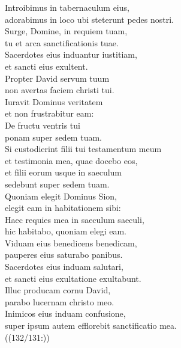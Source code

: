 \documentclass{ees}
\begin{document}
{\begin{multicols}{2}
    Introibimus in tabernaculum eius,\\
    adorabimus in loco ubi steterunt pedes nostri.\\
    Surge, Domine, in requiem tuam,\\
    tu et arca sanctificationis tuae.\\
    Sacerdotes eius induantur iustitiam,\\
    et sancti eius exultent.\\
    Propter David servum tuum\\
    non avertas faciem christi tui.\\
    Iuravit Dominus veritatem\\
    et non frustrabitur eam:\\
    De fructu ventris tui\\
    ponam super sedem tuam.\\
    Si custodierint filii tui testamentum meum\\
    et testimonia mea, quae docebo eos,\\
    et filii eorum usque in saeculum\\
    sedebunt super sedem tuam.\\
    Quoniam elegit Dominus Sion,\\
    elegit eam in habitationem sibi:\\
    Haec requies mea in saeculum saeculi,\\
    hic habitabo, quoniam elegi eam.\\
    Viduam eius benedicens benedicam,\\
    pauperes eius saturabo panibus.\\
    Sacerdotes eius induam salutari,\\
    et sancti eius exultatione exultabunt.\\
    Illuc producam cornu David,\\
    parabo lucernam christo meo.\\
    Inimicos eius induam confusione,\\
    super ipsum autem efflorebit sanctificatio mea.\\
    ((132/131:))
  \end{multicols}
}


\eesToc{}

\eesScore
\end{document}
